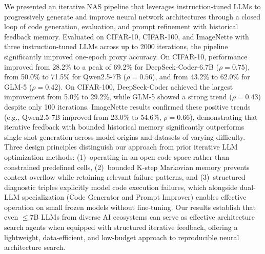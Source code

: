 \documentclass[10pt,twocolumn,letterpaper]{article}
\begin{document}
	We presented an iterative NAS pipeline that leverages instruction-tuned LLMs to progressively generate and improve neural network architectures through a closed loop of code generation, evaluation, and prompt refinement with historical feedback memory. Evaluated on CIFAR-10, CIFAR-100, and ImageNette with three instruction-tuned LLMs across up to 2000 iterations, the pipeline significantly improved one-epoch proxy accuracy. On CIFAR-10, performance improved from 28.2\% to a peak of 69.2\% for DeepSeek-Coder-6.7B ($\rho = 0.75$), from 50.0\% to 71.5\% for Qwen2.5-7B ($\rho = 0.56$), and from 43.2\% to 62.0\% for GLM-5 ($\rho = 0.42$). On CIFAR-100, DeepSeek-Coder achieved the largest improvement from 5.0\% to 29.2\%, while GLM-5 showed a strong trend ($\rho = 0.43$) despite only 100 iterations. ImageNette results confirmed these positive trends (e.g., Qwen2.5-7B improved from 23.0\% to 54.6\%, $\rho = 0.66$), demonstrating that iterative feedback with bounded historical memory significantly outperforms single-shot generation across model origins and datasets of varying difficulty. Three design principles distinguish our approach from prior iterative LLM optimization methods: (1)~operating in an open code space rather than constrained predefined cells, (2)~bounded K-step Markovian memory prevents context overflow while retaining relevant failure patterns, and (3)~structured diagnostic triples explicitly model code execution failures, which alongside dual-LLM specialization (Code Generator and Prompt Improver) enables effective operation on small frozen models without fine-tuning. Our results establish that even $\leq$7B LLMs from diverse AI ecosystems can serve as effective architecture search agents when equipped with structured iterative feedback, offering a lightweight, data-efficient, and low-budget approach to reproducible neural architecture search.
	
	{
		\small
		
		
	}
	
\end{document}
